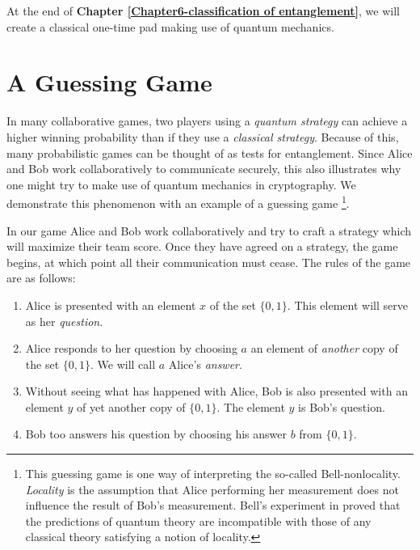 At the end of \textbf{Chapter \ref{Chapter6-classification of entanglement}}, we will create a classical one-time pad making use of quantum mechanics.







\pagebreak

\section{A Guessing Game} \label{section: bell-nonlocality}
In many collaborative games, two players using a {\emph{quantum strategy}} can achieve a higher winning probability than if they use a {\emph{classical strategy}}. Because of this, many probabilistic games can be thought of as tests for entanglement.  Since Alice and Bob work collaboratively to communicate securely, this also illustrates why one might try to make use of quantum mechanics in cryptography.  We demonstrate this phenomenon with an example of a guessing game \footnote{This guessing game is one way of interpreting the so-called Bell-nonlocality. \emph{Locality} is the assumption that Alice performing her measurement does not influence the result of Bob's measurement. Bell's experiment in \cite{bell1964}  proved that the predictions of quantum theory are incompatible with those of any classical theory satisfying a notion of locality.}.

In our game Alice and Bob work collaboratively and try to craft a strategy which will maximize their team score.  Once they have agreed on a strategy, the game begins, at which point all their communication must cease.  The rules of the game are as follows:
\begin{enumerate}
\item Alice is presented with an element $x$ of the set $\{0,1\}$.  This element will serve as her {\emph{question}}.
\item Alice responds to her question by choosing $a$ an element of {\emph{another}} copy of the set $\{0,1\}$.  We will call $a$ Alice's {\emph{answer}}. 
\item Without seeing what has happened with Alice, Bob is also presented with an element $y$ of yet another copy of $\{0,1\}$. The element $y$ is Bob's question.
\item Bob too answers his question by choosing his answer $b$ from $\{0,1\}$.
\end{enumerate}

